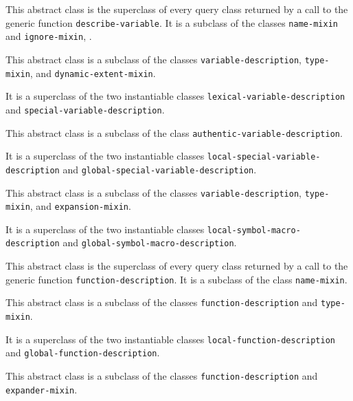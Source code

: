 {\footnotesize
{}
}

This abstract class is the superclass of every query class returned by
a call to the generic function \texttt{describe-variable}.  It is a
subclass of the classes \texttt{name-mixin} and \texttt{ignore-mixin}, .

{\footnotesize
{}
}

This abstract class is a subclass of the classes
\texttt{variable-description}, \texttt{type-mixin}, and
\texttt{dynamic-extent-mixin}.

It is a superclass of the two instantiable classes
\texttt{lexical-variable-description} and
\texttt{special-variable-description}.

{\footnotesize
{}
}

This abstract class is a subclass of the class
\texttt{authentic-variable-description}.

It is a superclass of the two instantiable classes
\texttt{local-special-variable-description} and
\texttt{global-special-variable-description}.

{\footnotesize
{}
}

This abstract class is a subclass of the classes
\texttt{variable-description}, \texttt{type-mixin}, and
\texttt{expansion-mixin}.

It is a superclass of the two instantiable classes
\texttt{local-symbol-macro-description} and
\texttt{global-symbol-macro-description}.

{\footnotesize
{}
}

This abstract class is the superclass of every query class returned by
a call to the generic function \texttt{function-description}.  It is a
subclass of the class \texttt{name-mixin}.

{\footnotesize
{}
}

This abstract class is a subclass of the classes
\texttt{function-description} and \texttt{type-mixin}.

It is a superclass of the two instantiable classes
\texttt{local-function-description} and
\texttt{global-function-description}.

{\footnotesize
{}
}

This abstract class is a subclass of the classes
\texttt{function-description} and \texttt{expander-mixin}.

